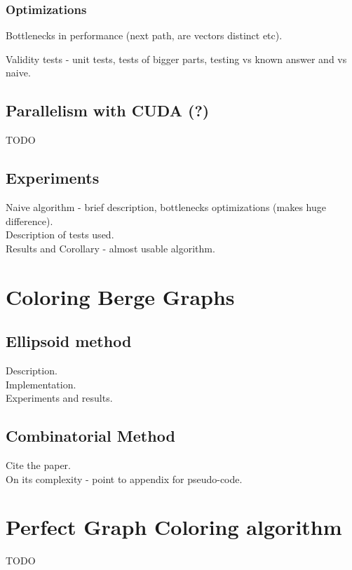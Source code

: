 \documentclass{report}
\begin{document}
\subsection{Optimizations}\label{Optimizations}
Bottlenecks in performance (next path, are vectors distinct etc).\\

Validity tests - unit tests, tests of bigger parts, testing vs known answer and vs naive.

\section{Parallelism with CUDA (?)}

TODO

\section{Experiments}

Naive algorithm - brief description, bottlenecks optimizations (makes huge difference).\\

Description of tests used.\\

Results and Corollary - almost usable algorithm.



\chapter{Coloring Berge Graphs}

\section{Ellipsoid method}

Description.\\

Implementation.\\

Experiments and results.\\

\section{Combinatorial Method}

Cite the paper.\\

On its complexity - point to appendix for pseudo-code.

\appendix
\appendixpage
\addappheadtotoc

\chapter{Perfect Graph Coloring algorithm}
TODO


% 
\printbibliography
\end{document}
